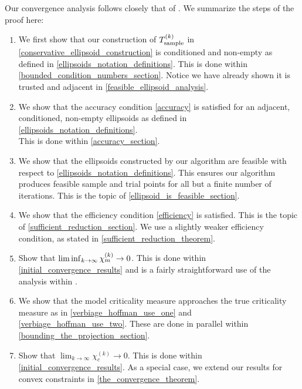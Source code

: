Our convergence analysis follows closely that of \cite{Conejo:2013:GCT:2620806.2621814}.
We summarize the steps of the proof here:
\begin{enumerate}
\item We first show that our construction of ${T_{\text{sample}}^{(k)}}$ in \cref{conservative_ellipsoid_construction} is conditioned and non-empty as defined in \cref{ellipsoids_notation_definitions}.
This is done within \cref{bounded_condition_numbers_section}.
Notice we have already shown it is trusted and adjacent in \cref{feasible_ellipsoid_analysis}.
\item We show that the accuracy condition \cref{accuracy} is satisfied for an adjacent, conditioned, non-empty ellipsoids as defined in \cref{ellipsoids_notation_definitions}. \\
This is done within \cref{accuracy_section}.
\item We show that the ellipsoids constructed by our algorithm are feasible with respect to \cref{ellipsoids_notation_definitions}.
This ensures our algorithm produces feasible sample and trial points for all but a finite number of iterations.
This is the topic of \cref{ellipsoid_is_feasible_section}.
\item We show that the efficiency condition \cref{efficiency} is satisfied.
This is the topic of \cref{sufficient_reduction_section}.
We use a slightly weaker efficiency condition, as stated in \cref{sufficient_reduction_theorem}.
\item Show that $\liminf_{k\to\infty} {\chi_m^{(k)}} \to 0$.
This is done within \cref{initial_convergence_results} and is a fairly straightforward use of the analysis within \cite{Conejo:2013:GCT:2620806.2621814}.
\item We show that the model criticality measure approaches the true criticality measure as in \cref{verbiage_hoffman_use_one} and \cref{verbiage_hoffman_use_two}.
These are done in parallel within \cref{bounding_the_projection_section}.
\item Show that $\lim_{k\to\infty} \chi_c^{(k)} \to 0$.
This is done within \cref{initial_convergence_results}.
As a special case, we extend our results for convex constraints in \cref{the_convergence_theorem}.


\end{enumerate}

